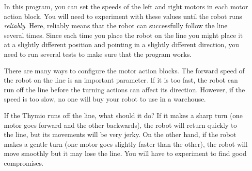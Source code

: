 In this program, you can set the speeds of the
left and right motors in each motor action block. You will need to
experiment with these values until the robot runs \emph{reliably}. Here,
reliably means that the robot can successfully follow the line several times.
Since each time you place the robot on
the line you might place it at a slightly different position and
pointing in a slightly different direction, you need to run
several tests to make sure that the program works.

There are many ways to configure the motor action blocks.
The forward speed of the robot on the line is an important parameter.
If it is too fast, the robot can run off the line before the turning actions can affect its direction. However, if the speed is too slow, no one will buy your robot to use in a warehouse.

If the Thymio runs off the line, what should it do?
If it makes a sharp turn (one motor goes forward and the other backwards),
the robot will return quickly to the line, but its movements will be very jerky.
On the other hand, if the robot makes a gentle turn (one motor goes slightly faster than the other), the robot will move smoothly but it may lose the line.
You will have to experiment to find good compromises.


\vfill


\vfill


